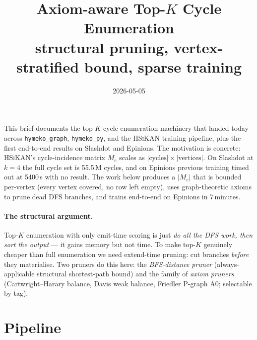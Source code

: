 \documentclass[11pt,a4paper]{article}
\title{Axiom-aware Top-$K$ Cycle Enumeration\\[2pt]
       \large{\normalfont structural pruning, vertex-stratified bound, \HSiKAN{} sparse training}}
\author{}
\date{2026-05-05}
\newcommand{\HSiKAN}{\textsc{HSiKAN}}
\newcommand{\code}[1]{\texttt{\small #1}}
\begin{document}
\maketitle

\noindent
This brief documents the top-$K$ cycle enumeration machinery that
landed today across \code{hymeko\_graph}, \code{hymeko\_py}, and the
\HSiKAN{} training pipeline, plus the first end-to-end results on
Slashdot and Epinions. The motivation is concrete: \HSiKAN{}'s
cycle-incidence matrix $M_e$ scales as $|\text{cycles}| \times
|\text{vertices}|$. On Slashdot at $k=4$ the full cycle set is
55.5\,M cycles, and on Epinions previous training timed out at
5400\,s with no result. The work below produces a $|M_e|$ that is
bounded per-vertex (every vertex covered, no row left empty), uses
graph-theoretic axioms to prune dead DFS branches, and trains
end-to-end on Epinions in 7\,minutes.

\paragraph{The structural argument.} Top-$K$ enumeration with only
emit-time scoring is just \emph{do all the DFS work, then sort the
output} --- it gains memory but not time. To make top-$K$ genuinely
cheaper than full enumeration we need extend-time pruning: cut
branches \emph{before} they materialise. Two pruners do this here:
the \emph{BFS-distance pruner} (always-applicable structural
shortest-path bound) and the family of \emph{axiom pruners}
(Cartwright--Harary balance, Davis weak balance, Friedler P-graph
A0; selectable by tag).

\section{Pipeline}

\begin{center}
\end{center}
\end{document}
